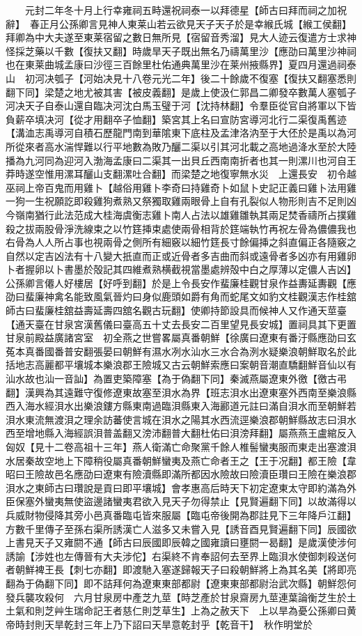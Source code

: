 　　元封二年冬十月上行幸雍祠五畤還祝祠泰一以拜德星【師古曰拜而祠之加祝辭】　春正月公孫卿言見神人東莱山若云欲見天子天子於是幸緱氏城【緱工侯翻】拜卿為中大夫遂至東莱宿留之數日無所見【宿留音秀溜】見大人迹云復遣方士求神怪採芝藥以千數【復扶又翻】時歲旱天子既出無名乃禱萬里沙【應劭曰萬里沙神祠也在東莱曲城孟康曰沙徑三百餘里杜佑通典萬里沙在莱州掖縣界】夏四月還過祠泰山　初河决瓠子【河始决見十八卷元光二年】後二十餘歲不復塞【復扶又翻塞悉則翻下同】梁楚之地尤被其害【被皮義翻】是歲上使汲仁郭昌二卿發卒數萬人塞瓠子河决天子自泰山還自臨决河沈白馬玉璧于河【沈持林翻】令羣臣從官自將軍以下皆負薪卒填决河【從才用翻卒子恤翻】築宮其上名曰宣防宮導河北行二渠復禹舊迹【溝洫志禹導河自積石歷龍門南到華隂東下底柱及孟津洛汭至于大伾於是禹以為河所從來者高水湍悍難以行平地數為敗乃釃二渠以引其河北載之高地過洚水至於大陸播為九河同為迎河入渤海孟康曰二渠其一出貝丘西南南折者也其一則漯川也河自王莽時遂空惟用漯耳釃山支翻漯吐合翻】而梁楚之地復寧無水災　上還長安　初令越巫祠上帝百鬼而用雞卜【越俗用雞卜李奇曰持雞奇卜如鼠卜史記正義曰雞卜法用雞一狗一生祝願訖即殺雞狗煮熟又祭獨取雞兩眼骨上自有孔裂似人物形則吉不足則凶今嶺南猶行此法范成大桂海虞衡志雞卜南人占法以雄雞雛執其兩足焚香禱所占撲雞殺之拔兩股骨淨洗線束之以竹筳挿束處使兩骨相背於筳端執竹再祝左骨為儂儂我也右骨為人人所占事也視兩骨之側所有細竅以細竹筳長寸餘偏挿之斜直偏正各隨竅之自然以定吉凶法有十八變大扺直而正或近骨者多吉曲而斜或遠骨者多凶亦有用雞卵卜者握卵以卜書墨於殻記其四維煮熟横截視當墨處辨殻中白之厚薄以定儂人吉凶】　公孫卿言僊人好樓居【好呼到翻】於是上令長安作蜚廉桂觀甘泉作益夀延夀觀【應劭曰蜚廉神禽名能致風氣晉灼曰身似鹿頭如爵有角而蛇尾文如豹文桂觀漢志作桂舘師古曰蜚廉桂舘益壽延壽四舘名觀古玩翻】使卿持節設具而候神人又作通天莖臺【通天臺在甘泉宮漢舊儀曰臺高五十丈去長安二百里望見長安城】置祠具其下更置甘泉前殿益廣諸宮室　初全燕之世嘗畧屬真番朝鮮【徐廣曰遼東有番汙縣應劭曰玄菟本真番國番普安翻張晏曰朝鮮有濕水冽水汕水三水合為洌水疑樂浪朝鮮取名於此括地志高麗都平壤城本樂浪郡王險城又古云朝鮮索應曰案朝音潮直驕翻鮮音仙以有汕水故也汕一音訕】為置吏築障塞【為于偽翻下同】秦滅燕屬遼東外徼【徼古弔翻】漢興為其遠難守復修遼東故塞至浿水為界【班志浿水出遼東塞外西南至樂浪縣西入海水經浿水出樂浪鏤方縣東南過臨浿縣東入海酈道元註曰滿自浿水而至朝鮮若浿水東流無渡浿之理余訪蕃使言城在浿水之陽其水西流逕樂浪郡朝鮮縣故志曰浿水西至增地縣入海經誤浿普盖翻又滂沛翻普大翻杜佑曰浿滂拜翻】屬燕燕王盧綰反入匈奴【見十二卷高祖十三年】燕人衛滿亡命聚黨千餘人椎髻蠻夷服而東走出塞渡浿水居秦故空地上下障稍役屬真番朝鮮蠻夷及燕亡命者王之【王于况翻】都王險【韋昭曰王險故邑名應劭曰遼東有險瀆縣即滿所都因水險故曰險瀆臣瓚曰王險在樂浪郡浿水之東師古曰瓚說是貢曰即平壤城】會孝惠高后時天下初定遼東太守即約滿為外臣保塞外蠻夷無使盜邊諸蠻夷君欲入見天子勿得禁止【見賢遍翻下同】以故滿得以兵威財物侵降其旁小邑真番臨屯皆來服屬【臨屯帝後開為郡註見下三年降戶江翻】方數千里傳子至孫右渠所誘漢亡人滋多又未嘗入見【誘音酉見賢遍翻下同】辰國欲上書見天子又雍閼不通【師古曰辰國即辰韓之國雍讀曰壅閼一曷翻】是歲漢使涉何誘諭【涉姓也左傳晉有大夫涉佗】右渠終不肯奉詔何去至界上臨浿水使御刺殺送何者朝鮮裨王長【刺七亦翻】即渡馳入塞遂歸報天子曰殺朝鮮將上為其名美【將即亮翻為于偽翻下同】即不詰拜何為遼東東部都尉【遼東東部都尉治武次縣】朝鮮怨何發兵襲攻殺何　六月甘泉房中產芝九莖【時芝產於甘泉齋房九莖連葉論衡芝生於土土氣和則芝艸生瑞命記王者慈仁則芝草生】上為之赦天下　上以旱為憂公孫卿曰黄帝時封則天旱乾封三年上乃下詔曰天旱意乾封乎【乾音干】　秋作明堂於
